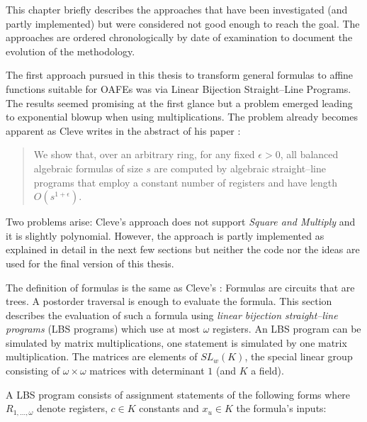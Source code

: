 \label{sec:discontinued}

This chapter briefly describes the approaches that have been investigated (and
partly implemented) but were considered not good enough to reach the goal. The
approaches are ordered chronologically by date of examination to document the
evolution of the methodology.


%
%
\label{sec:using-lbs}

The first approach pursued in this thesis to transform general formulas to
affine functions suitable for OAFEs was via Linear Bijection Straight--Line
Programs.  The results seemed promising at the first glance but a problem
emerged leading to exponential blowup when using multiplications. The problem
already becomes apparent as Cleve writes in the abstract of his paper
\cite{cleve91}:

\begin{quote}
  We show that, over an arbitrary ring, for any fixed $\epsilon > 0$, all
  balanced algebraic formulas of size $s$ are computed by algebraic
  straight--line programs that employ a constant number of registers and have
  length $O(s^{1 + \epsilon})$.
\end{quote}

\noindent{}Two problems arise: Cleve's approach does not support \emph{Square
and Multiply} and it is slightly polynomial. However, the approach
is partly implemented as explained in detail in the next few sections but
neither the code nor the ideas are used for the final version of this thesis.

\label{sec:FormulasToMatrixMuls}

The definition of formulas is the same as Cleve's \cite{cleve91}: Formulas are
circuits that are trees. A postorder traversal is enough to evaluate the
formula. This section describes the evaluation of such a formula using
\emph{linear bijection straight--line programs} (LBS programs) \cite{cleve91}
which use at most $\omega$ registers. An LBS program can be simulated by matrix
multiplications, one statement is simulated by one matrix multiplication. The
matrices are elements of $SL_w(K)$, the special linear group consisting of
$\omega \times \omega$ matrices with determinant $1$ (and $K$ a field).

A LBS program consists of assignment statements of the following
forms where $R_{1,\ldots,\omega}$ denote registers, $c \in K$ constants and $x_u
\in K$ the formula's inputs:

